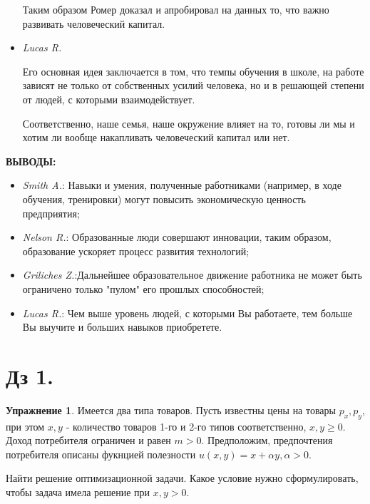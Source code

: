 \documentclass[reqno]{article}
\theoremstyle{definition}
\theoremstyle{definition}
\theoremstyle{definition}
\theoremstyle{definition}
\theoremstyle{definition}
\newtheorem{exc}{Упражнение}[section]
\theoremstyle{definition}
\theoremstyle{definition}
\theoremstyle{definition}
\theoremstyle{definition}
\begin{document}
\begin{itemize}
					Таким образом Ромер доказал и апробировал на данных то, что важно развивать человеческий капитал.
					
				\item \emph{Lucas R.}	
				
					Его основная идея заключается в том, что темпы обучения в школе, на работе зависят не только от собственных усилий человека, но и в решающей степени от людей, с которыми взаимодействует.
					
					Соответственно, наше семья, наше окружение влияет на то, готовы ли мы и хотим ли вообще накапливать человеческий капитал или нет.
					
			\end{itemize}
			
			\textbf{ВЫВОДЫ:}
			
			\begin{itemize}
				\item \emph{Smith A.}: Навыки и умения, полученные работниками (например, в ходе обучения, тренировки) могут повысить экономическую ценность предприятия;
				
				\item \emph{Nelson R.}: Образованные люди совершают инновации, таким образом, образование ускоряет процесс развития технологий;
				
				\item \emph{Griliches Z.}:Дальнейшее образовательное движение работника не может быть ограничено только "пулом" его прошлых способностей;
				
				\item \emph{Lucas R.}: Чем выше уровень людей, с которыми Вы работаете, тем больше Вы выучите и больших навыков приобретете.
			\end{itemize}
			
			
	\section*{Дз 1.}
		\begin{exc}
			Имеется два типа товаров. Пусть известны цены на товары $p_x, p_y$, при этом $x, y$ - количество товаров 1-го и 2-го типов соответственно, $x,y \geq 0$. Доход потребителя ограничен и равен $m > 0$. Предположим, предпочтения потребителя описаны фукнцией полезности $u(x,y) = x + \alpha y, \alpha > 0.$
			
			Найти решение оптимизационной задачи. Какое условие нужно сформулировать, чтобы задача имела решение при $x,y > 0$.
		\end{exc}
		
\end{document}
